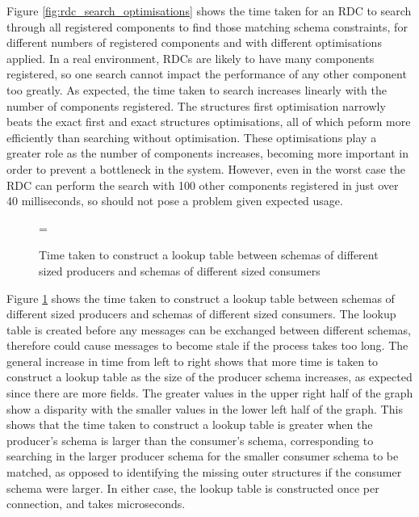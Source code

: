 \documentclass[12pt,twoside,notitlepage]{report}
\begin{document}
Figure \ref{fig:rdc_search_optimisations} shows the time taken for an RDC to search through all registered components to find those matching schema constraints, for different numbers of registered components and with different optimisations applied. 
In a real environment, RDCs are likely to have many components registered, so one search cannot impact the performance of any other component too greatly.
As expected, the time taken to search increases linearly with the number of components registered. 
The structures first optimisation narrowly beats the exact first and exact structures optimisations, all of which peform more efficiently than searching without optimisation. 
These optimisations play a greater role as the number of components increases, becoming more important in order to prevent a bottleneck in the system. 
However, even in the worst case the RDC can perform the search with 100 other components registered in just over 40 milliseconds, so should not pose a problem given expected usage.

\begin{figure}[tbh]
\epsfxsize=\hsize
\centerline{}
\caption[Construct Lookup Times]{Time taken to construct a lookup table between schemas of different sized producers and schemas of different sized consumers}
\label{fig:construct_lookup}
\end{figure}

Figure \ref{fig:construct_lookup} shows the time taken to construct a lookup table between schemas of different sized producers and schemas of different sized consumers. 
The lookup table is created before any messages can be exchanged between different schemas, therefore could cause messages to become stale if the process takes too long.
The general increase in time from left to right shows that more time is taken to construct a lookup table as the size of the producer schema increases, as expected since there are more fields. 
The greater values in the upper right half of the graph show a disparity with the smaller values in the lower left half of the graph. 
This shows that the time taken to construct a lookup table is greater when the producer's schema is larger than the consumer's schema, corresponding to searching in the larger producer schema for the smaller consumer schema to be matched, as opposed to identifying the missing outer structures if the consumer schema were larger.
In either case, the lookup table is constructed once per connection, and takes microseconds.
\end{document}

